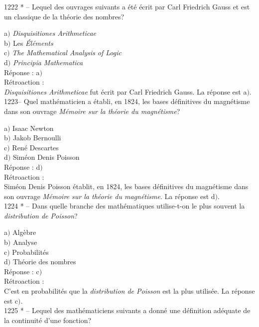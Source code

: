 ﻿\documentclass[letterpaper, 12pt]{article}
\begin{document}
1222 * -- Lequel des ouvrages suivants a \'et\'e \'ecrit par Carl
Friedrich Gauss et est un classique de la th\'eorie des nombres?

a$)$ {\sl Disquisitiones Arithmeticae} \\
b$)$ Les {\sl \'El\'ements} \\
c$)$ {\sl The Mathematical Analysis of Logic} \\
d$)$ {\sl Principia Mathematica}\\

R\'eponse : a$)$\\

R\'etroaction : \\
{\sl Disquisitiones Arithmeticae} fut \'ecrit par Carl Friedrich
Gauss.
La r\'eponse est a$)$.\\

1223-- Quel math\'ematicien a \'etabli, en 1824, les bases
d\'efinitives du magn\'etisme dans son ouvrage {\sl M\'emoire sur la
th\'eorie du magn\'etisme}?

a$)$ Isaac Newton \\
b$)$ Jakob Bernoulli \\
c$)$ Ren\'e Descartes \\
d$)$ Sim\'eon Denis Poisson\\

R\'eponse : d$)$\\

R\'etroaction : \\
Sim\'eon Denis Poisson \'etablit, en 1824, les bases d\'efinitives
du magn\'etisme dans son ouvrage {\sl M\'emoire sur la th\'eorie du
magn\'etisme}.
La r\'eponse est d$)$.\\

1224 * -- Dans quelle branche des math\'ematiques utilise-t-on le
plus souvent la {\sl distribution de Poisson}?

a$)$ Alg\`ebre \\
b$)$ Analyse \\
c$)$ Probabilit\'es \\
d$)$ Th\'eorie des nombres\\

R\'eponse : c$)$\\

R\'etroaction : \\
C'est en probabilit\'es que la {\sl distribution de Poisson} est la plus
utilis\'ee.
La r\'eponse est c$)$.\\

1225 * -- Lequel des math\'ematiciens suivants a donn\'e une
d\'efinition ad\'equate de la continuit\'e d'une fonction?
\end{document}
